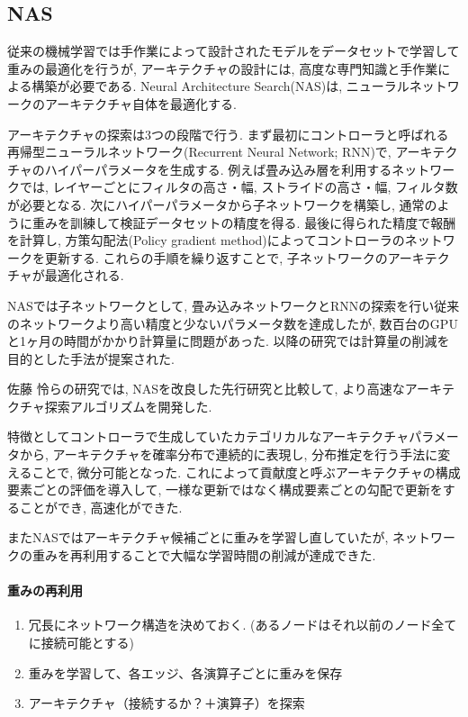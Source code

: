 \documentclass[twocolumn]{jarticle}     %
\begin{document}
\subsection{NAS}
従来の機械学習では手作業によって設計されたモデルをデータセットで学習して重みの最適化を行うが, アーキテクチャの設計には, 高度な専門知識と手作業による構築が必要である.
Neural Architecture Search(NAS)\cite{DBLP:journals/corr/ZophL16}は, ニューラルネットワークのアーキテクチャ自体を最適化する.



アーキテクチャの探索は3つの段階で行う.
まず最初にコントローラと呼ばれる再帰型ニューラルネットワーク(Recurrent Neural Network; RNN)で, アーキテクチャのハイパーパラメータを生成する.
例えば畳み込み層を利用するネットワークでは, レイヤーごとにフィルタの高さ・幅, ストライドの高さ・幅, フィルタ数が必要となる.
次にハイパーパラメータから子ネットワークを構築し, 通常のように重みを訓練して検証データセットの精度を得る.
最後に得られた精度で報酬を計算し, 方策勾配法(Policy gradient method)によってコントローラのネットワークを更新する.
これらの手順を繰り返すことで, 子ネットワークのアーキテクチャが最適化される.

NASでは子ネットワークとして, 畳み込みネットワークとRNNの探索を行い従来のネットワークより高い精度と少ないパラメータ数を達成したが, 数百台のGPUと1ヶ月の時間がかかり計算量に問題があった.
以降の研究では計算量の削減を目的とした手法が提案された.

佐藤 怜ら\cite{ANAS}の研究では, NASを改良した先行研究と比較して, より高速なアーキテクチャ探索アルゴリズムを開発した.

特徴としてコントローラで生成していたカテゴリカルなアーキテクチャパラメータから,
アーキテクチャを確率分布で連続的に表現し, 分布推定を行う手法に変えることで, 微分可能となった.
これによって貢献度と呼ぶアーキテクチャの構成要素ごとの評価を導入して, 一様な更新ではなく構成要素ごとの勾配で更新をすることができ, 高速化ができた.

またNASではアーキテクチャ候補ごとに重みを学習し直していたが, ネットワークの重みを再利用することで大幅な学習時間の削減が達成できた.

\paragraph{重みの再利用}
\begin{enumerate}
  \item 冗長にネットワーク構造を決めておく. (あるノードはそれ以前のノード全てに接続可能とする)
  \item 重みを学習して、各エッジ、各演算子ごとに重みを保存
  \item アーキテクチャ（接続するか？＋演算子）を探索
\end{enumerate}
\end{document}
